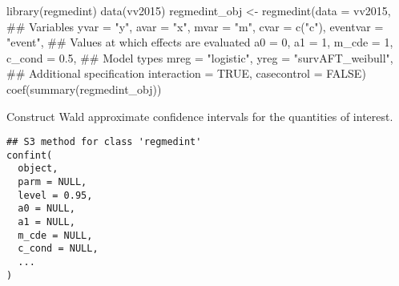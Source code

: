 \documentclass[a4paper]{book}
\begin{document}
\begin{Examples}
\begin{ExampleCode}
library(regmedint)
data(vv2015)
regmedint_obj <- regmedint(data = vv2015,
                           ## Variables
                           yvar = "y",
                           avar = "x",
                           mvar = "m",
                           cvar = c("c"),
                           eventvar = "event",
                           ## Values at which effects are evaluated
                           a0 = 0,
                           a1 = 1,
                           m_cde = 1,
                           c_cond = 0.5,
                           ## Model types
                           mreg = "logistic",
                           yreg = "survAFT_weibull",
                           ## Additional specification
                           interaction = TRUE,
                           casecontrol = FALSE)
coef(summary(regmedint_obj))

\end{ExampleCode}
\end{Examples}
%
\begin{Description}
Construct Wald approximate confidence intervals for the quantities of interest.
\end{Description}
%
\begin{Usage}
\begin{verbatim}
## S3 method for class 'regmedint'
confint(
  object,
  parm = NULL,
  level = 0.95,
  a0 = NULL,
  a1 = NULL,
  m_cde = NULL,
  c_cond = NULL,
  ...
)
\end{verbatim}
\end{Usage}
%
\end{document}
